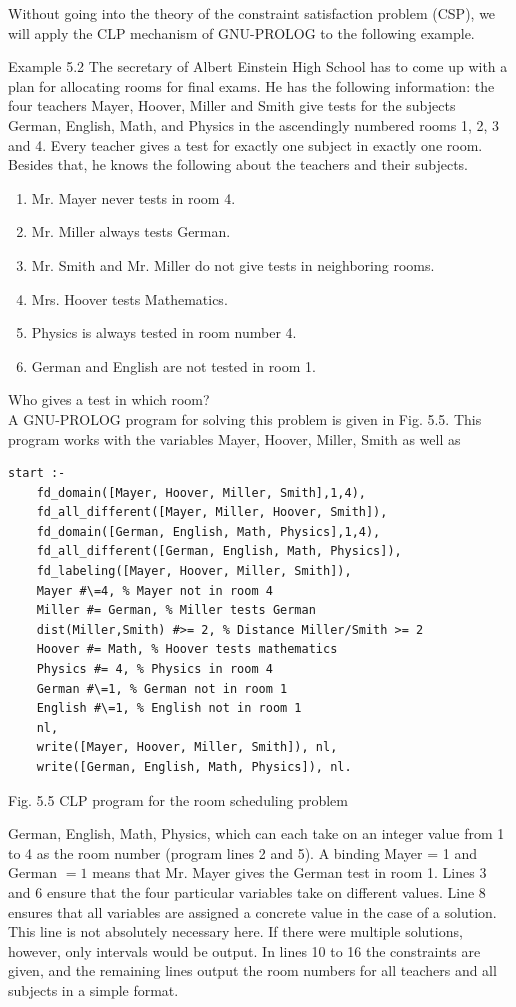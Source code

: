 \documentclass[10pt]{book}
\begin{document}
Without going into the theory of the constraint satisfaction problem (CSP), we will apply the CLP mechanism of GNU-PROLOG to the following example.

Example 5.2 The secretary of Albert Einstein High School has to come up with a plan for allocating rooms for final exams. He has the following information: the four teachers Mayer, Hoover, Miller and Smith give tests for the subjects German, English, Math, and Physics in the ascendingly numbered rooms 1, 2, 3 and 4. Every teacher gives a test for exactly one subject in exactly one room. Besides that, he knows the following about the teachers and their subjects.

\begin{enumerate}
  \item Mr. Mayer never tests in room 4.
  \item Mr. Miller always tests German.
  \item Mr. Smith and Mr. Miller do not give tests in neighboring rooms.
  \item Mrs. Hoover tests Mathematics.
  \item Physics is always tested in room number 4.
  \item German and English are not tested in room 1.
\end{enumerate}

Who gives a test in which room?\\
A GNU-PROLOG program for solving this problem is given in Fig. 5.5. This program works with the variables Mayer, Hoover, Miller, Smith as well as

\begin{verbatim}
start :-
    fd_domain([Mayer, Hoover, Miller, Smith],1,4),
    fd_all_different([Mayer, Miller, Hoover, Smith]),
    fd_domain([German, English, Math, Physics],1,4),
    fd_all_different([German, English, Math, Physics]),
    fd_labeling([Mayer, Hoover, Miller, Smith]),
    Mayer #\=4, % Mayer not in room 4
    Miller #= German, % Miller tests German
    dist(Miller,Smith) #>= 2, % Distance Miller/Smith >= 2
    Hoover #= Math, % Hoover tests mathematics
    Physics #= 4, % Physics in room 4
    German #\=1, % German not in room 1
    English #\=1, % English not in room 1
    nl,
    write([Mayer, Hoover, Miller, Smith]), nl,
    write([German, English, Math, Physics]), nl.
\end{verbatim}

Fig. 5.5 CLP program for the room scheduling problem

German, English, Math, Physics, which can each take on an integer value from 1 to 4 as the room number (program lines 2 and 5). A binding Mayer = 1 and German $=1$ means that Mr. Mayer gives the German test in room 1. Lines 3 and 6 ensure that the four particular variables take on different values. Line 8 ensures that all variables are assigned a concrete value in the case of a solution. This line is not absolutely necessary here. If there were multiple solutions, however, only intervals would be output. In lines 10 to 16 the constraints are given, and the remaining lines output the room numbers for all teachers and all subjects in a simple format.
\end{document}
